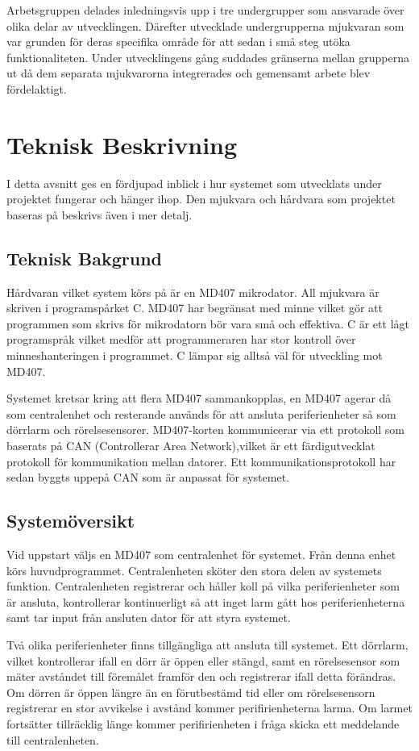 \documentclass[a4paper]{article}
\begin{document}
Arbetsgruppen delades inledningsvis upp i tre undergrupper som ansvarade över olika delar av utvecklingen. Därefter utvecklade undergrupperna mjukvaran som var grunden för deras specifika område för att sedan i små steg utöka funktionaliteten. Under utvecklingens gång suddades gränserna mellan grupperna ut då dem separata mjukvarorna integrerades och gemensamt arbete blev fördelaktigt.


\section{Teknisk Beskrivning}
I detta avsnitt ges en fördjupad inblick i hur systemet som utvecklats under projektet fungerar och hänger ihop. Den mjukvara och hårdvara som projektet baseras på beskrivs även i mer detalj.

\subsection{Teknisk Bakgrund}
Hårdvaran vilket system körs på är en MD407 mikrodator. All mjukvara är skriven i programspårket C. MD407 har begränsat med minne vilket gör att programmen som skrivs för mikrodatorn bör vara små och effektiva. C är ett lågt programspråk vilket medför att programmeraren har stor kontroll över minneshanteringen i programmet. C lämpar sig alltså väl för utveckling mot MD407.

Systemet kretsar kring att flera MD407 sammankopplas, en MD407 agerar då som centralenhet och resterande används för att ansluta periferienheter så som dörrlarm och rörelsesensorer. MD407-korten kommunicerar via ett protokoll som baserats på CAN (Controllerar Area Network),vilket är ett färdigutvecklat protokoll för kommunikation mellan datorer. Ett kommunikationsprotokoll har sedan byggts uppepå CAN som är anpassat för systemet.

\subsection{Systemöversikt}

Vid uppstart väljs en MD407 som centralenhet för systemet. Från denna enhet körs huvudprogrammet. Centralenheten sköter den stora delen av systemets funktion. Centralenheten registrerar och håller koll på vilka periferienheter som är ansluta, kontrollerar kontinuerligt så att inget larm gått hos periferienheterna samt tar input från ansluten dator för att styra systemet.

Två olika periferienheter finns tillgängliga att ansluta till systemet. Ett dörrlarm, vilket kontrollerar ifall en dörr är öppen eller stängd, samt en rörelsesensor som mäter avståndet till föremålet framför den och registrerar ifall detta förändras. Om dörren är öppen längre än en förutbestämd tid eller om rörelsesensorn registrerar en stor avvikelse i avstånd kommer perifirienheterna larma. Om larmet fortsätter tillräcklig länge kommer perifirienheten i fråga skicka ett meddelande till centralenheten.
\end{document}
